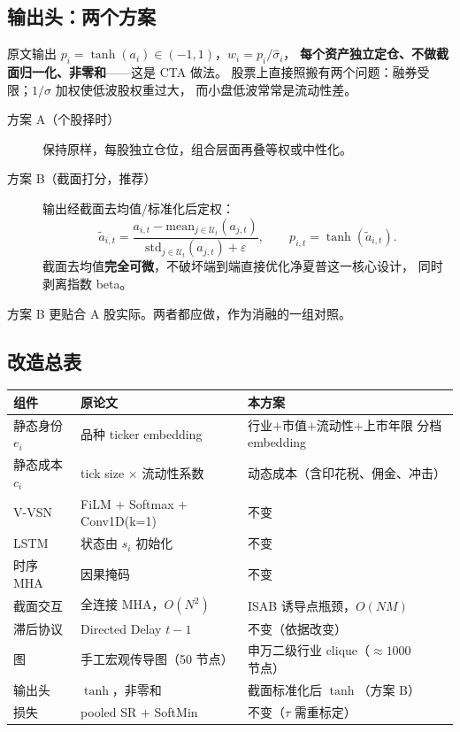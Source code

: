\documentclass[11pt, a4paper]{ctexart}
\begin{document}
\subsection{输出头：两个方案}

原文输出 $p_i = \tanh(a_i)\in(-1,1)$，$w_i = p_i/\hat\sigma_i$，
\textbf{每个资产独立定仓、不做截面归一化、非零和}——这是 CTA 做法。
股票上直接照搬有两个问题：融券受限；$1/\hat\sigma$ 加权使低波股权重过大，
而小盘低波常常是流动性差。

\begin{description}
  \item[方案 A（个股择时）] 保持原样，每股独立仓位，组合层面再叠等权或中性化。
  \item[方案 B（截面打分，推荐）] 输出经截面去均值/标准化后定权：
    \begin{equation}
      \tilde a_{i,t} = \frac{a_{i,t} - \mathrm{mean}_{j\in\mathcal{U}_t}(a_{j,t})}
                             {\mathrm{std}_{j\in\mathcal{U}_t}(a_{j,t}) + \varepsilon},
      \qquad p_{i,t} = \tanh(\tilde a_{i,t}).
    \end{equation}
    截面去均值\textbf{完全可微}，不破坏端到端直接优化净夏普这一核心设计，
    同时剥离指数 beta。
\end{description}

方案 B 更贴合 A 股实际。两者都应做，作为消融的一组对照。

\subsection{改造总表}

\begin{table}[h]
\centering
\small
\begin{tabular}{lll}
\toprule
组件 & 原论文 & 本方案 \\
\midrule
静态身份 $e_i$ & 品种 ticker embedding & 行业$+$市值$+$流动性$+$上市年限 分档 embedding \\
静态成本 $c_i$ & tick size $\times$ 流动性系数 & 动态成本（含印花税、佣金、冲击） \\
V-VSN & FiLM $+$ Softmax $+$ Conv1D(k=1) & 不变 \\
LSTM & 状态由 $s_i$ 初始化 & 不变 \\
时序 MHA & 因果掩码 & 不变 \\
截面交互 & 全连接 MHA，$O(N^2)$ & ISAB 诱导点瓶颈，$O(NM)$ \\
滞后协议 & Directed Delay $t-1$ & 不变（依据改变） \\
图 & 手工宏观传导图（50 节点） & 申万二级行业 clique（$\approx 1000$ 节点） \\
输出头 & $\tanh$，非零和 & 截面标准化后 $\tanh$（方案 B） \\
损失 & pooled SR $+$ SoftMin & 不变（$\tau$ 需重标定） \\
\bottomrule
\end{tabular}
\end{table}
\end{document}
